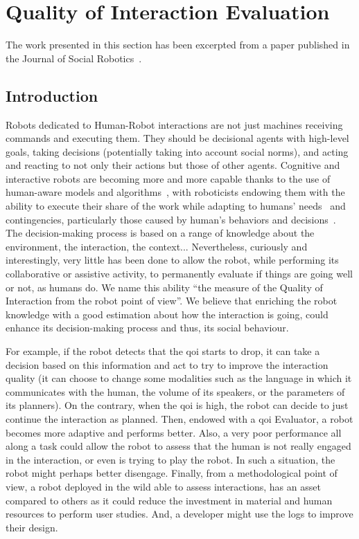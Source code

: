 \documentclass[a4paper,11pt,twoside]{StyleThese}
\begin{document}
	\setcounter{chapter}{6} %
	\dominitoc
	\faketableofcontents
	\fi
	
\chapter{Quality of Interaction Evaluation}\label{chapter:chap7}
\minitoc

The work presented in this section has been excerpted from a paper published in the Journal of Social Robotics~\cite{mayima_2021_towards}.

\section{Introduction}

Robots dedicated to Human-Robot interactions are not just machines receiving commands and executing them. They should be decisional agents with high-level goals, taking decisions (potentially taking into account social norms), and acting and reacting to not only their actions but those of other agents. Cognitive and interactive robots are becoming more and more capable thanks to the use of human-aware models and algorithms~\cite{kruse2013,thomaz_2016_computational}, with roboticists endowing them with the ability to execute their share of the work while adapting to humans' needs~\cite{napoli_2019_layered} and contingencies, particularly those caused by human's behaviors and decisions~\cite{hoffman_2007_fluency,baraglia_2017_efficient,lemaignan_2017_artificial}. The decision-making process is based on a range of knowledge about the environment, the interaction, the context... Nevertheless, curiously and interestingly, very little has been done to allow the robot, while performing its collaborative or assistive activity, to permanently evaluate if things are going well or not, as humans do. We name this ability ``the measure of the Quality of Interaction from the robot point of view''. We believe that enriching the robot knowledge with a good estimation about how the interaction is going, could enhance its decision-making process and thus, its social behaviour.

For example, if the robot detects that the \acrshort{qoi} starts to drop, it can take a decision based on this information and act to try to improve the interaction quality (\eg it can choose to change some modalities such as the language in which it communicates with the human, the volume of its speakers, or the parameters of its planners). On the contrary, when the \acrshort{qoi} is high, the robot can decide to just continue the interaction as planned. Then, endowed with a \acrshort{qoi} Evaluator, a robot becomes more adaptive and performs better. Also, a very poor performance all along a task could allow the robot to assess that the human is not really engaged in the interaction, or even is trying to play the robot. In such a situation, the robot might perhaps better disengage. 
Finally, from a methodological point of view, a robot deployed in the wild able to assess interactions, has an asset compared to others as it could reduce the investment in material and human resources to perform user studies. And, a developer might use the logs to improve their design. 
\end{document}
